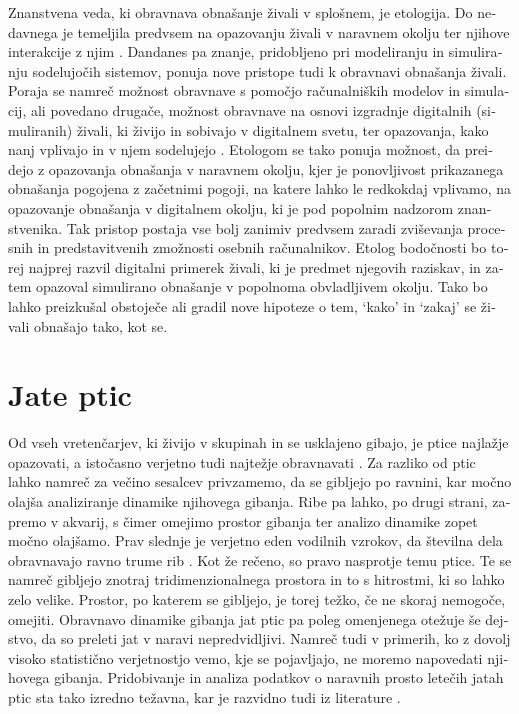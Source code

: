 \begin{slovenian}
Znanstvena veda, ki obravnava obnašanje živali v splošnem, je etologija. Do nedavnega je temeljila predvsem na opazovanju živali v naravnem okolju ter njihove interakcije z njim \cite{watts:1998}. Dandanes pa znanje, pridobljeno pri modeliranju in simuliranju sodelujočih sistemov, ponuja nove pristope tudi k obravnavi obnašanja živali. Poraja se namreč možnost obravnave s pomočjo računalniških modelov in simulacij, ali povedano drugače, možnost obravnave na osnovi izgradnje digitalnih (simuliranih) živali, ki živijo in sobivajo v digitalnem svetu, ter opazovanja, kako nanj vplivajo in v njem sodelujejo \cite{bentley:2002}. Etologom se tako ponuja možnost, da preidejo z opazovanja obnašanja v naravnem okolju, kjer je ponovljivost prikazanega obnašanja pogojena z začetnimi pogoji, na katere lahko le redkokdaj vplivamo, na opazovanje obnašanja v digitalnem okolju, ki je pod popolnim nadzorom znanstvenika. Tak pristop postaja vse bolj zanimiv predvsem zaradi zviševanja procesnih in predstavitvenih zmožnosti osebnih računalnikov. Etolog bodočnosti bo torej najprej razvil digitalni primerek živali, ki je predmet njegovih raziskav, in zatem opazoval simulirano obnašanje v popolnoma obvladljivem okolju. Tako bo lahko preizkušal obstoječe ali gradil nove hipoteze o tem, `kako' in `zakaj' se živali obnašajo tako, kot se.

\section{Jate ptic}
Od vseh vretenčarjev, ki živijo v skupinah in se usklajeno gibajo, je ptice najlažje opazovati, a istočasno verjetno tudi najtežje obravnavati \cite{heppner:1997}. Za razliko od ptic lahko namreč za večino sesalcev privzamemo, da se gibljejo po ravnini, kar močno olajša analiziranje dinamike njihovega gibanja. Ribe pa lahko, po drugi strani, zapremo v akvarij, s čimer omejimo prostor gibanja ter analizo dinamike zopet močno olajšamo. Prav slednje je verjetno eden vodilnih vzrokov, da številna dela obravnavajo ravno trume rib \cite{aoki:1982,dill:1997,mcfarland:1997,partridge:1982,shaw:1962,terzopoulos:1994,tu:1994,tu:1999,ward:2001,zaera:1996}. Kot že rečeno, so pravo nasprotje temu ptice. Te se namreč gibljejo znotraj tridimenzionalnega prostora in to s hitrostmi, ki so lahko zelo velike. Prostor, po katerem se gibljejo, je torej težko, če ne skoraj nemogoče, omejiti. Obravnavo dinamike gibanja jat ptic pa poleg omenjenega otežuje še dejstvo, da so preleti jat v naravi nepredvidljivi. Namreč tudi v primerih, ko z dovolj visoko statistično verjetnostjo vemo, kje se pojavljajo, ne moremo napovedati njihovega gibanja. Pridobivanje in analiza podatkov o naravnih prosto letečih jatah ptic sta tako izredno težavna, kar je razvidno tudi iz literature \cite{gould:1974,heppner:1997,jaffe:1997,moyle:1998}.


\end{slovenian}
